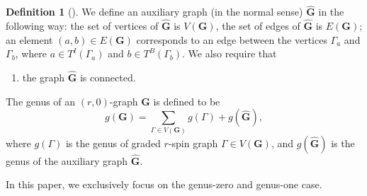 \documentclass[11pt]{amsart}
\theoremstyle{definition}
\newtheorem{dfn}[dummy]{Definition}
\theoremstyle{remark}
\newcommand{\<}{\left<}
\renewcommand{\>}{\right>}
\numberwithin{equation}{section}
\begin{document}
\begin{dfn}[{\cite[Definition 4.7]{TZ1}}]
    We %
define an auxiliary graph (in the normal sense) $\hat{\mathbf{G}}$ in the following way: the set of vertices of $\hat{\mathbf{G}}$ is $V(\mathbf{G})$, the set of edges of $\hat{\mathbf{G}}$ %
is $E(\mathbf{G})$; an %
element $(a,b)\in E(\mathbf{G})$ corresponds  to an edge between the vertices $\Gamma_a$ and $\Gamma_b$, where  $a\in T^I(\Gamma_a)$ and $b\in T^B(\Gamma_b)$. We also require that
\begin{enumerate}[resume*]
    \item  the graph $\hat{\mathbf{G}}$ is connected.
\end{enumerate}

The genus of an $(r,0)$-graph $\mathbf{G}$ is defined to be 
$$
g(\mathbf{G})=\sum_{\Gamma\in V(\bm{G})}g(\Gamma)+g(\hat{\mathbf{G}}),
$$
where $g(\Gamma)$ is the genus of graded $r$-spin graph $\Gamma\in V(\bm{G})$, and $g(\hat{\mathbf{G}})$ is the genus of the auxiliary graph $\hat{\mathbf{G}}$.

\end{dfn}

In this paper, we exclusively focus on the genus-zero and genus-one case.
\end{document}
